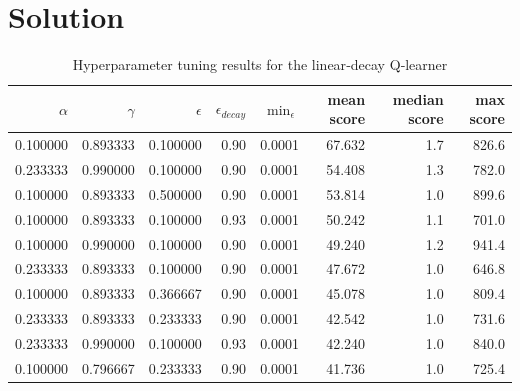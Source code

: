 \documentclass[submit]{../harvardml}
\newenvironment{solution}
  {\color{blue}\section*{Solution}}
{}
\begin{document}
\begin{solution}
\begin{table}[htbp]
\centering
\begin{tabular}{rrrrrrrr}
\hline
$\alpha$ & $\gamma$ & $\epsilon$ & $\epsilon_{decay}$ & $\min_{\epsilon}$ & mean score & median score & max score \\
\hline
0.100000 & 0.893333 & 0.100000 & 0.90 & 0.0001 & 67.632 & 1.7 & 826.6 \\
0.233333 & 0.990000 & 0.100000 & 0.90 & 0.0001 & 54.408 & 1.3 & 782.0 \\
0.100000 & 0.893333 & 0.500000 & 0.90 & 0.0001 & 53.814 & 1.0 & 899.6 \\
0.100000 & 0.893333 & 0.100000 & 0.93 & 0.0001 & 50.242 & 1.1 & 701.0 \\
0.100000 & 0.990000 & 0.100000 & 0.90 & 0.0001 & 49.240 & 1.2 & 941.4 \\
0.233333 & 0.893333 & 0.100000 & 0.90 & 0.0001 & 47.672 & 1.0 & 646.8 \\
0.100000 & 0.893333 & 0.366667 & 0.90 & 0.0001 & 45.078 & 1.0 & 809.4 \\
0.233333 & 0.893333 & 0.233333 & 0.90 & 0.0001 & 42.542 & 1.0 & 731.6 \\
0.233333 & 0.990000 & 0.100000 & 0.93 & 0.0001 & 42.240 & 1.0 & 840.0 \\
0.100000 & 0.796667 & 0.233333 & 0.90 & 0.0001 & 41.736 & 1.0 & 725.4 \\
\hline
\end{tabular}
\caption{Hyperparameter tuning results for the linear‐decay Q‐learner}
\end{table}
\end{solution}
\end{document}
